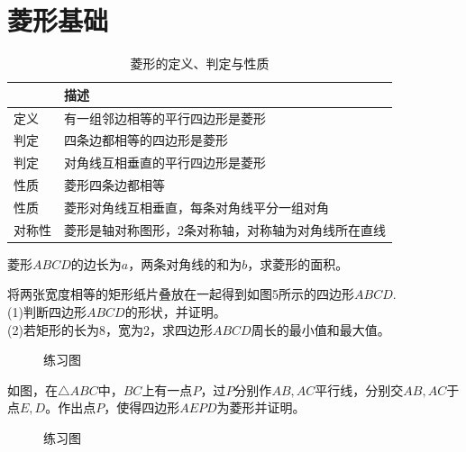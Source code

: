 \section{菱形基础}
\begin{table}[H]
    \centering
    \caption{菱形的定义、判定与性质}
    \begin{tabular}{|l|l|}
        \hline
            & 描述                         \\
        \hline
        定义  & 有一组邻边相等的平行四边形是菱形           \\
        \hline
        判定  & 四条边都相等的四边形是菱形              \\
        \hline
        判定  & 对角线互相垂直的平行四边形是菱形           \\
        \hline
        性质  & 菱形四条边都相等                   \\
        \hline
        性质  & 菱形对角线互相垂直，每条对角线平分一组对角      \\
        \hline
        对称性 & 菱形是轴对称图形，2条对称轴，对称轴为对角线所在直线 \\
        \hline
    \end{tabular}
\end{table}
\begin{problem}
菱形$ABCD$的边长为$a$，两条对角线的和为$b$，求菱形的面积。
\end{problem}
\begin{problem}
将两张宽度相等的矩形纸片叠放在一起得到如图5所示的四边形$ABCD$. \\
(1)判断四边形$ABCD$的形状，并证明。 \\
(2)若矩形的长为8，宽为2，求四边形$ABCD$周长的最小值和最大值。 \\
\end{problem}
\begin{figure}[H]
    \centering
    \resizebox{4cm}{!}{}
    \caption{练习图}
\end{figure}
\begin{problem}
如图，在$\triangle ABC$中，$BC$上有一点$P$，过$P$分别作$AB,AC$平行线，分别交$AB,AC$于点$E,D$。作出点$P$，使得四边形$AEPD$为菱形并证明。
\end{problem}
\begin{figure}[H]
    \centering
    \resizebox{4cm}{!}{}
    \caption{练习图}
\end{figure}
